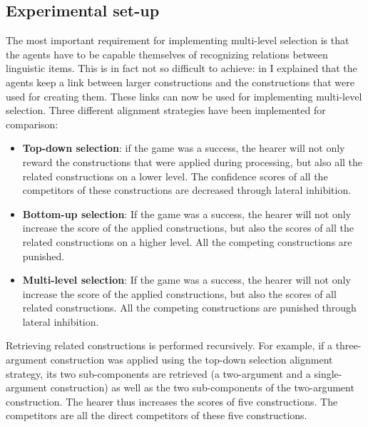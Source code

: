 \subsection{Experimental set-up}

The most important requirement for implementing multi-level selection is that the agents have to be capable themselves of recognizing relations between linguistic items. This is in fact not so difficult to achieve: in  I explained that the agents keep a link between larger constructions and the constructions that were used for creating them. These links can now be used for implementing multi-level selection. Three different alignment strategies have been implemented for comparison:

\begin{itemize}
\item {\bfseries Top-down selection}: if the game was a success, the hearer will not only reward the constructions that were applied during processing, but also all the related constructions on a lower level. The confidence scores of all the competitors of these constructions are decreased through lateral inhibition.
\item {\bfseries Bottom-up selection}: If the game was a success, the hearer will not only increase the score of the applied constructions, but also the scores of all the related constructions on a higher level. All the competing constructions are punished.
\item {\bfseries Multi-level selection}: If the game was a success, the hearer will not only increase the score of the applied constructions, but also the scores of all related constructions. All the competing constructions are punished through lateral inhibition.
\end{itemize}

Retrieving related constructions is performed recursively. For example, if a three-argument construction was applied using the top-down selection alignment strategy, its two sub-components are retrieved (a two-argument and a single-argument construction) as well as the two sub-components of the two-argument construction. The hearer thus increases the scores of five constructions. The competitors are all the direct competitors of these five constructions.


